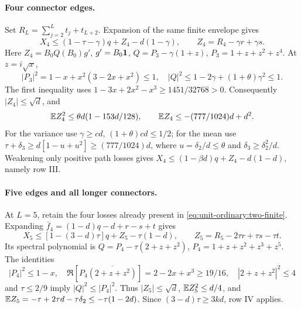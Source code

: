 \paragraph{Four connector edges.}
Set \(R_L=\sum_{j=2}^Lt_j+t_{L+2}\).
Expansion of the same finite envelope gives
\[
 X_4\le(1-\tau-\gamma)q+Z_4-d(1-\gamma),
 \qquad Z_4=R_4-\gamma r+\gamma s.
\]
Here \(Z_4=B_0Q(B_0)g'\), \(g'=B_0\mathbf1\),
\(Q=P_3-\gamma(1+z)\), \(P_3=1+z+z^2+z^4\).
At \(z=i\sqrt x\),
\[
 |P_3|^2=1-x+x^2(3-2x+x^2)\le1,
 \quad
 |Q|^2\le1-2\gamma+(1+\theta)\gamma^2\le1.
\]
The first inequality uses
\(1-3x+2x^2-x^3\ge1451/32768>0\).
Consequently \(|Z_4|\le\sqrt d\), and
\[
 \mathbb E Z_4^2\le\theta d(1-153d/128),\qquad
 \mathbb E Z_4\le-(777/1024)d+d^2.
\]
For the variance use \(\gamma\ge cd\),
\((1+\theta)cd\le1/2\); for the mean use
\(\tau+\delta_3\ge d[1-u+u^2]\ge(777/1024)d\),
where \(u=\delta_2/d\le\theta\) and
\(\delta_3\ge\delta_2^2/d\).
Weakening only positive path losses gives
\(X_4\le(1-\beta d)q+Z_4-d(1-d)\), namely row III.

\paragraph{Five edges and all longer connectors.}
At \(L=5\), retain the four losses already present in
\eqref{eq:unit-ordinary:two-finite}. Expanding
\(\bar f_4=(1-d)q-d+r-s+t\) gives
\[
 X_5\le[1-(3-d)\tau]q+Z_5-\tau(1-d),
 \qquad Z_5=R_5-2\tau r+\tau s-\tau t.
\]
Its spectral polynomial is
\(Q=P_4-\tau(2+z+z^2)\), \(P_4=1+z+z^2+z^3+z^5\).
The identities
\[
 |P_4|^2\le1-x,\quad
 \Re[P_4\overline{(2+z+z^2)}]=2-2x+x^3\ge19/16,
 \quad |2+z+z^2|^2\le4
\]
and \(\tau\le2/9\) imply \(|Q|^2\le|P_4|^2\).
Thus \(|Z_5|\le\sqrt d\), \(\mathbb E Z_5^2\le d/4\), and
\(\mathbb E Z_5=-\tau+2\tau d-\tau\delta_2
\le-\tau(1-2d)\).
Since \((3-d)\tau\ge3kd\), row IV applies.

